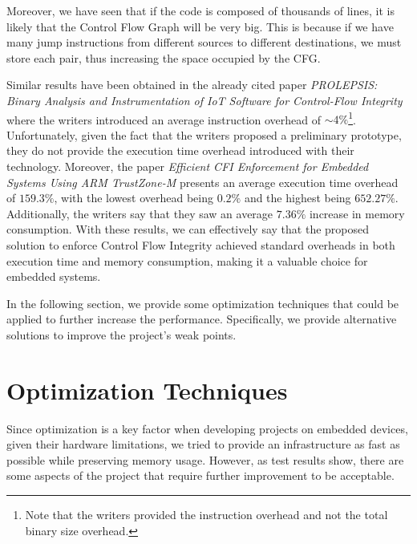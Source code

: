 Moreover, we have seen that if the code is composed of thousands of lines, it is
likely that the Control Flow Graph will be very big. This is because if we have many
jump instructions from different sources to different destinations, we must
store each pair, thus increasing the space occupied by the CFG.

Similar results have been obtained in the already cited paper \textit{PROLEPSIS:
Binary Analysis and Instrumentation of IoT Software for Control-Flow Integrity}\cite{article2}
where the writers introduced an average instruction overhead of $\sim 4\%$\footnote{Note
that the writers provided the instruction overhead and not the total binary size
overhead.}. Unfortunately, given the fact that the writers proposed a
preliminary prototype, they do not provide the execution time overhead introduced
with their technology. Moreover, the paper \textit{Efficient CFI Enforcement for
Embedded Systems Using ARM TrustZone-M}\cite{article1} presents an average execution
time overhead of $1 59.3 \%$, with the lowest overhead being $0.2 \%$ and the
highest being $652.2 7 \%$. Additionally, the writers say that they saw an
average $7.36\%$ increase in memory consumption. With these results, we can
effectively say that the proposed solution to enforce Control Flow Integrity
achieved standard overheads in both execution time and memory consumption, making
it a valuable choice for embedded systems.

In the following section, we provide some optimization techniques that could be
applied to further increase the performance. Specifically, we provide
alternative solutions to improve the project's weak points.

\section{Optimization Techniques}
\label{sec:pa_optimization}

Since optimization is a key factor when developing projects on embedded devices,
given their hardware limitations, we tried to provide an infrastructure as fast as
possible while preserving memory usage. However, as test results show, there are
some aspects of the project that require further improvement to be acceptable.


